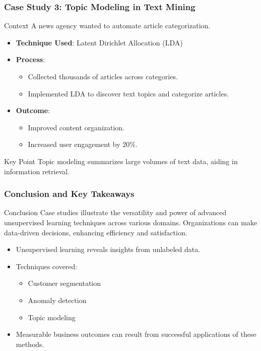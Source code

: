 \documentclass[aspectratio=169]{beamer}
\begin{document}
\begin{frame}[fragile]
    \frametitle{Case Study 3: Topic Modeling in Text Mining}

    \begin{block}{Context}
        A news agency wanted to automate article categorization.
    \end{block}

    \begin{itemize}
        \item \textbf{Technique Used}: Latent Dirichlet Allocation (LDA)
        \item \textbf{Process}:
        \begin{itemize}
            \item Collected thousands of articles across categories.
            \item Implemented LDA to discover text topics and categorize articles.
        \end{itemize}
        \item \textbf{Outcome}:
        \begin{itemize}
            \item Improved content organization.
            \item Increased user engagement by 20\%.
        \end{itemize}
    \end{itemize}

    \begin{block}{Key Point}
        Topic modeling summarizes large volumes of text data, aiding in information retrieval.
    \end{block}
\end{frame}

\begin{frame}[fragile]
    \frametitle{Conclusion and Key Takeaways}

    \begin{block}{Conclusion}
        Case studies illustrate the versatility and power of advanced unsupervised learning techniques across various domains. 
        Organizations can make data-driven decisions, enhancing efficiency and satisfaction.
    \end{block}

    \begin{itemize}
        \item Unsupervised learning reveals insights from unlabeled data.
        \item Techniques covered:
        \begin{itemize}
            \item Customer segmentation
            \item Anomaly detection
            \item Topic modeling
        \end{itemize}
        \item Measurable business outcomes can result from successful applications of these methods.
    \end{itemize}
\end{frame}
\end{document}

